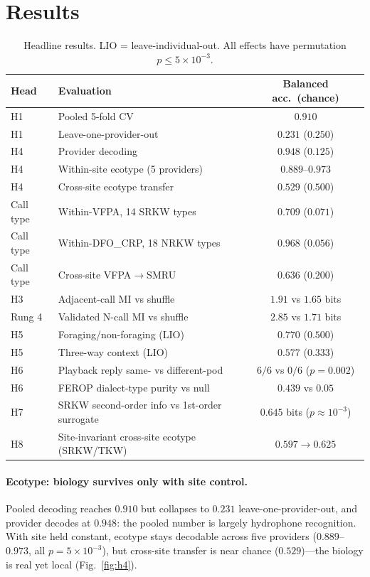 \documentclass[11pt]{article}
\begin{document}
\section{Results}
\begin{table}[h]
\centering\small
\setlength{\tabcolsep}{4pt}
\begin{tabular}{llc}
\toprule
Head & Evaluation & Balanced acc.\ (chance) \\
\midrule
H1 & Pooled 5-fold CV & $0.910$ \\
H1 & Leave-one-provider-out & $0.231$ ($0.250$) \\
H4 & Provider decoding & $0.948$ ($0.125$) \\
H4 & Within-site ecotype (5 providers) & $0.889$--$0.973$ \\
H4 & Cross-site ecotype transfer & $0.529$ ($0.500$) \\
Call type & Within-VFPA, 14 SRKW types & $0.709$ ($0.071$) \\
Call type & Within-DFO\_CRP, 18 NRKW types & $0.968$ ($0.056$) \\
Call type & Cross-site VFPA$\to$SMRU & $0.636$ ($0.200$) \\
H3 & Adjacent-call MI vs shuffle & $1.91$ vs $1.65$ bits \\
Rung 4 & Validated N-call MI vs shuffle & $2.85$ vs $1.71$ bits \\
H5 & Foraging/non-foraging (LIO) & $0.770$ ($0.500$) \\
H5 & Three-way context (LIO) & $0.577$ ($0.333$) \\
H6 & Playback reply same- vs different-pod & $6/6$ vs $0/6$ ($p{=}0.002$) \\
H6 & FEROP dialect-type purity vs null & $0.439$ vs $0.05$ \\
H7 & SRKW second-order info vs 1st-order surrogate & $0.645$ bits ($p{\approx}10^{-3}$) \\
H8 & Site-invariant cross-site ecotype (SRKW/TKW) & $0.597{\to}0.625$ \\
\bottomrule
\end{tabular}
\caption{Headline results. LIO = leave-individual-out. All effects have permutation
$p\le 5\times10^{-3}$.}
\label{tab:five}
\end{table}

\paragraph{Ecotype: biology survives only with site control.} Pooled decoding reaches
$0.910$ but collapses to $0.231$ leave-one-provider-out, and provider decodes at $0.948$:
the pooled number is largely hydrophone recognition. With site held constant, ecotype stays
decodable across five providers ($0.889$--$0.973$, all $p=5\times10^{-3}$), but
cross-site transfer is near chance ($0.529$)---the biology is real yet local
(Fig.~\ref{fig:h4}).
\end{document}
